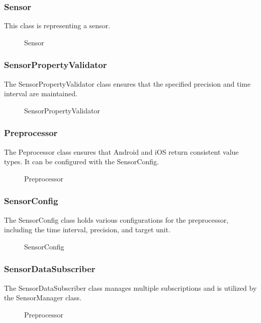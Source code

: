 \documentclass[12pt]{article}
\begin{document}
\subsubsection{Sensor}
This class is representing a sensor.
\begin{figure}[ht]
\centering

\caption{\label{fig:bild11} Sensor}
\end{figure}

\subsubsection{SensorPropertyValidator}
The SensorPropertyValidator class ensures that the specified precision and time interval are maintained.
\begin{figure}[ht]
\centering

\caption{\label{fig:bild12} SensorPropertyValidator}
\end{figure}
\newpage

\subsubsection{Preprocessor}
The Peprocessor class ensures that Android and iOS return consistent value types. It can be configured with the SensorConfig.
\begin{figure}[ht]
\centering

\caption{\label{fig:bild13} Preprocessor}
\end{figure}

\subsubsection{SensorConfig}
The SensorConfig class holds various configurations for the preprocessor, including the time interval, precision, and target unit.
\begin{figure}[ht]
\centering

\caption{\label{fig:bild14} SensorConfig}
\end{figure}

\newpage
\subsubsection{SensorDataSubscriber}
The SensorDataSubscriber class manages multiple subscriptions and is utilized by the SensorManager class.
\begin{figure}[ht]
\centering

\caption{\label{fig:bild15} Preprocessor}
\end{figure}
\end{document}
